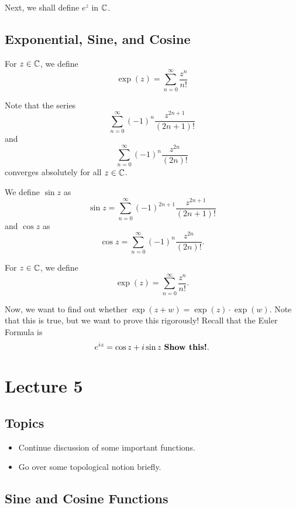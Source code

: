 \documentclass[a4paper]{report}
\begin{document}
Next, we shall define \( e^{z} \) in \( \mathbb{C}  \). 

\subsection{Exponential, Sine, and Cosine}

\begin{definition}
    For \( z \in \mathbb{C}  \), we define 
    \[ \exp(z) = \sum_{ n=0  }^{  \infty  } \frac{ z^{n} }{ n!  }   \]
\end{definition}
Note that the series 
            \[  \sum_{ n=0 }^{ \infty  } (-1)^{n} \frac{ z^{2n+1} }{ (2n+1)!  }  \]
            and 
            \[  \sum_{ n=0  }^{ \infty  } (-1)^{n} \frac{ z^{2n} }{ (2n)! }  \]
            converges absolutely for all \( z \in \mathbb{C}  \).
\begin{definition}
         We define  \( \sin z  \) as
            \[ \sin z = \sum_{ n=0 }^{ \infty  } (-1)^{2n+1} \frac{ z^{2n+1} }{ (2n+1)! } \]
            and \( \cos z  \) as 
            \[  \cos z  =  \sum_{ n = 0  }^{ \infty  } (-1)^{n} \frac{ z^{2n} }{ (2n)! }.  \]
\end{definition}

\begin{definition}[ ]
    For \( z \in \mathbb{C}  \), we define 
    \[  \exp(z) = \sum_{ n=0 }^{ \infty  } \frac{ z^{n} }{ n! }. \]
\end{definition}

Now, we want to find out whether \( \exp(z + w) = \exp(z) \cdot \exp(w) \). Note that this is true, but we want to prove this rigorously! Recall that the Euler Formula is
\[  e^{iz} = \cos z + i \sin z \  \text{\textbf{Show this!}}. \]

\section{Lecture 5}

\subsection{Topics}
\begin{itemize}
    \item Continue discussion of some important functions.
    \item Go over some topological notion briefly.
\end{itemize}

\subsection{Sine and Cosine Functions}
\end{document}
